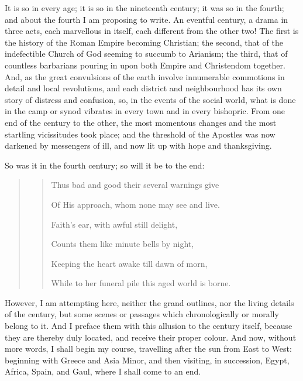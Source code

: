 It is so in every age; it is so in the nineteenth century; it was
so in the fourth; and about the fourth I am proposing to write. An
eventful century, a drama in three acts, each marvellous in itself,
each different from the other two! The first is the history of the
Roman Empire becoming Christian; the second, that of the indefectible
Church of God seeming to succumb to Arianism; the third, that of
countless barbarians pouring in upon both Empire and Christendom
together. And, as the great convulsions of the earth involve
innumerable commotions in detail and local revolutions, and each
district and neighbourhood has its own story of distress and
confusion, so, in the events of the social world, what is done in the
camp or synod vibrates in every town and in every bishopric. From one
end of the century to the other, the most momentous changes and the
most startling vicissitudes took place; and the threshold of the
Apostles was now darkened by messengers of ill, and now lit up with
hope and thanksgiving.

So was it in the fourth century; so will it be to the end:

\begin{quote}

\begin{quote}

Thus bad and good their several warnings give

Of His approach, whom none may see and live.

Faith's ear, with awful still delight,

Counts them like minute bells by night,

Keeping the heart awake till dawn of morn,

While to her funeral pile this aged world is borne.

\end{quote}

\end{quote}

However, I am attempting here, neither the grand outlines, nor the
living details of the century, but some scenes or passages which
chronologically or morally belong to it. And I preface them with this
allusion to the century itself, because they are thereby duly located,
and receive their proper colour. And now, without more words, I shall
begin my course, travelling after the sun from East to West: beginning
with Greece and Asia Minor, and then visiting, in succession, Egypt,
Africa, Spain, and Gaul, where I shall come to an end.

